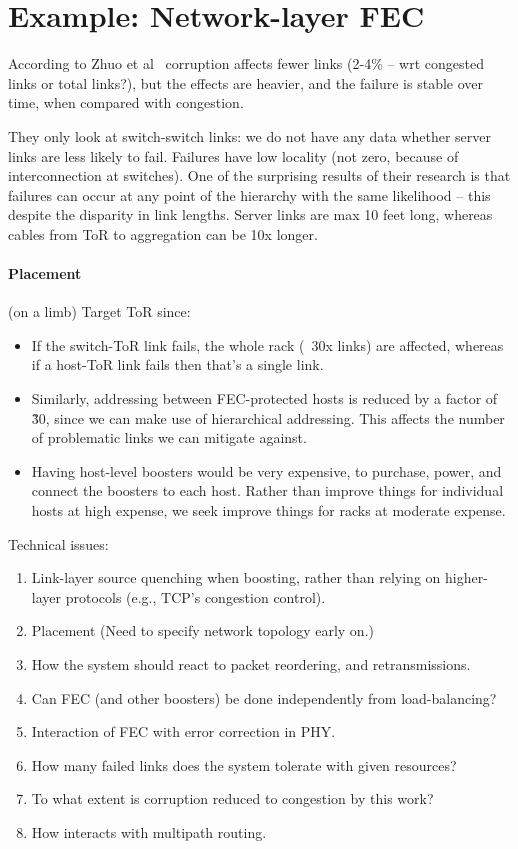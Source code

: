 \documentclass[sigconf]{acmart}
\begin{document}
\section{Example: Network-layer FEC}

According to Zhuo et al~\cite{Zhuo:2017:UMP:3098822.3098849} corruption affects fewer links (2-4\% -- wrt congested links or total links?), but the effects are heavier, and the failure is stable over time, when compared with congestion.

They only look at switch-switch links: we do not have any data whether server
links are less likely to fail. Failures have low locality (not zero, because
of interconnection at switches). One of the surprising results of their
research is that failures can occur at any point of the hierarchy with the
same likelihood -- this despite the disparity in link lengths. Server links
are max 10 feet long, whereas cables from ToR to aggregation can be 10x
longer.

\paragraph{Placement} (on a limb) Target ToR since:
\begin{itemize}
  \item If the switch-ToR link fails, the whole rack (~30x links) are
    affected, whereas if a host-ToR link fails then that's a single link.
  \item Similarly, addressing between FEC-protected hosts is reduced by a
    factor of \~30, since we can make use of hierarchical addressing. This
    affects the number of problematic links we can mitigate against.
  \item Having host-level boosters would be very expensive, to purchase, power, and connect the boosters to each host. Rather than improve things for individual hosts at high expense, we seek improve things for racks at moderate expense.
\end{itemize}


Technical issues:
\begin{enumerate}
  \item Link-layer source quenching when boosting, rather than relying on higher-layer protocols (e.g., TCP's congestion control).
  \item Placement (Need to specify network topology early on.)
  \item How the system should react to packet reordering, and retransmissions.
  \item Can FEC (and other boosters) be done independently from load-balancing?
  \item Interaction of FEC with error correction in PHY.
  \item How many failed links does the system tolerate with given resources?
  \item To what extent is corruption reduced to congestion by this work?
  \item How interacts with multipath routing.
\end{enumerate}
\end{document}
